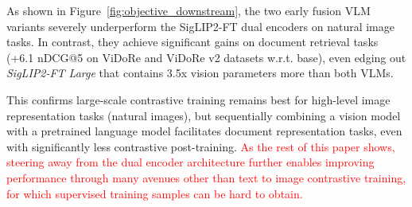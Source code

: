 As shown in Figure~\ref{fig:objective_downstream}, the two early fusion VLM variants severely underperform the SigLIP2-FT dual encoders on natural image tasks. In contrast, they achieve significant gains on document retrieval tasks (+6.1 nDCG@5 on ViDoRe and ViDoRe v2 datasets w.r.t. base), even edging out \textit{SigLIP2-FT Large} that contains 3.5x vision parameters more than both VLMs.


This confirms large-scale contrastive training remains best for high-level image representation tasks (natural images), but sequentially combining a vision model with a pretrained language model facilitates document representation tasks, even with significantly less contrastive post-training. \textcolor{red}{As the rest of this paper shows, steering away from the dual encoder architecture further enables improving performance through many avenues other than text to image contrastive training, for which supervised training samples can be hard to obtain.}



